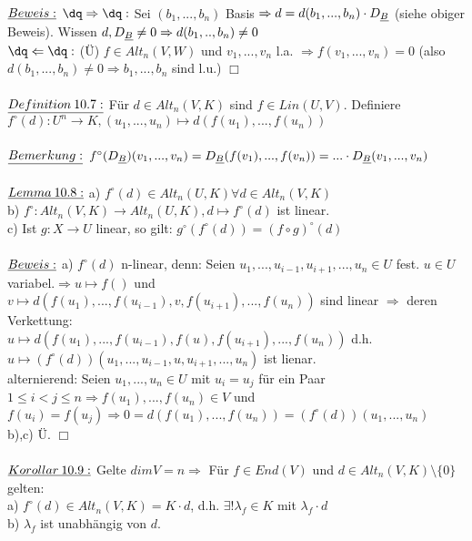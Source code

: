 \documentclass[fleqn, a4paper, 11pt]{article}
\begin{document}
\\
$\uline{Beweis:}$ $\dq\Rightarrow\dq:$ Sei $(b_1,...,b_n)$ Basis $\Rightarrow d=d(b_1,...,b_n)\cdot D_{\uline{B}}$ (siehe obiger Beweis). Wissen $d,D_{\uline{B}}\neq 0\Rightarrow d(b_1,..,b_n)\neq 0$\\
$\dq\Leftarrow\dq:$ (\"U) $f\in Alt_n(V,W)$ und $v_1,...,v_n$ l.a. $\Rightarrow f(v_1,...,v_n)=0$ (also $d(b_1,...,b_n)\neq 0\Rightarrow b_1,...,b_n$ sind l.u.) \hfill $\Box$\\
\\
$\uline{Definition\:10.7:}$ F\"ur $d\in Alt_n(V,K)$ sind $f\in Lin(U,V)$. Definiere $f^{\circ}(d):U^n\rightarrow K,(u_1,...,u_n)\mapsto d(f(u_1),...,f(u_n))$\\
\\
$\uline{Bemerkung:}$ $f^{\circ}(D_{\uline{B}})(v_1,...,v_n)=D_{\uline{B}}(f(v_1),...,f(v_n))=...\cdot D_{\uline{B}}(v_1,...,v_n)$\\
\\
$\uline{Lemma\:10.8:}$ a) $f^{\circ}(d)\in Alt_n(U,K) \forall d\in Alt_n(V,K)$\\
b) $f^{\circ}:Alt_n(V,K)\rightarrow Alt_n(U,K),d\mapsto f^{\circ}(d)$ ist linear.\\
c) Ist $g:X\rightarrow U$ linear, so gilt: $g^{\circ}(f^{\circ}(d))=(f\circ g)^{\circ}(d)$\\
\\
$\uline{Beweis:}$ a) $f^{\circ}(d)$ n-linear, denn: Seien $u_1,...,u_{i-1},u_{i+1},...,u_n\in U$ fest. $u\in U$ variabel.$\Rightarrow u\mapsto f()$ und $v\mapsto d(f(u_1),...,f(u_{i-1}),v,f(u_{i+1}),...,f(u_n))$ sind linear $\Rightarrow$ deren Verkettung:\\
$u\mapsto d(f(u_1),...,f(u_{i-1}),f(u),f(u_{i+1}),...,f(u_n))$ d.h. $u\mapsto (f^{\circ}(d))(u_1,...,u_{i-1},u,u_{i+1},...,u_n)$ ist lienar.\\
alternierend: Seien $u_1,...,u_n\in U$ mit $u_i=u_j$ f\"ur ein Paar $1\leq i<j\leq n\Rightarrow f(u_1),...,f(u_n)\in V$ und $f(u_i)=f(u_j)\Rightarrow 0=d(f(u_1),...,f(u_n))=(f^{\circ}(d))(u_1,...,u_n)$\\
b),c) \"U. \hfill $\Box$\\
\\
$\uline{Korollar\:10.9:}$ Gelte $dim V=n\Rightarrow$ F\"ur $f\in End(V)$ und $d\in Alt_n(V,K)\setminus\{0\}$ gelten:\\
a) $f^{\circ}(d)\in Alt_n(V,K)=K\cdot d$, d.h. $\exists!\lambda_f\in K$ mit $\lambda_f\cdot d$\\
b) $\lambda_f$ ist unabh\"angig von $d$.\\
\end{document}
